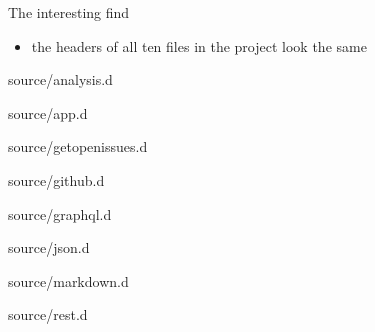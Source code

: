 \documentclass[aspectratio=169,notes]{beamer}
\begin{document}
	\begin{frame}[fragile]{The interesting find}
		\begin{itemize}
			\item the headers of all ten files in the project look the same
		\end{itemize}
	\end{frame}
	\begin{frame}[fragile]{source/analysis.d}
		
	\end{frame}
	\begin{frame}[fragile]{source/app.d}
		
	\end{frame}
	\begin{frame}[fragile]{source/getopenissues.d}
		
	\end{frame}
	\begin{frame}[fragile]{source/github.d}
		
	\end{frame}
	\begin{frame}[fragile]{source/graphql.d}
		
	\end{frame}
	\begin{frame}[fragile]{source/json.d}
		
	\end{frame}
	\begin{frame}[fragile]{source/markdown.d}
		
	\end{frame}
	\begin{frame}[fragile]{source/rest.d}
		
	\end{frame}
\end{document}
